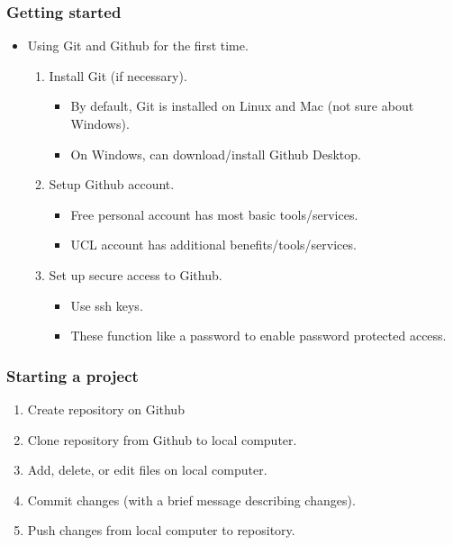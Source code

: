\documentclass{beamer}
\begin{document}
\begin{frame}
\frametitle{Getting started}
\begin{itemize}
\item Using Git and Github for the first time.
\begin{enumerate}
\item Install Git (if necessary).
\begin{itemize}
\item By default, Git is installed on Linux and Mac (not sure about Windows).
\item On Windows, can download/install Github Desktop.
\end{itemize}
\item Setup Github account.
\begin{itemize}
\item Free personal account has most basic tools/services.
\item UCL account has additional benefits/tools/services.
\end{itemize}
\item Set up secure access to Github.
\begin{itemize}
\item  Use ssh keys.
\item These function like a password to enable password protected access.
\end{itemize}
\end{enumerate}
\end{itemize}
\end{frame}

\begin{frame}
\frametitle{Starting a project}
\begin{enumerate}
\item Create repository on Github
\item Clone repository from Github to local computer.
\item Add, delete, or edit files on local computer.
\item Commit changes (with a brief message describing changes).
\item Push changes from local computer to repository. 
\end{enumerate}
\end{frame}
\end{document}
